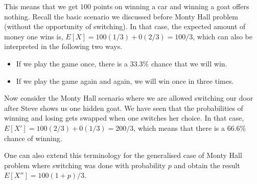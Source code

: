 \documentclass{book}
\begin{document}
This means that we get $100$ points on winning a car and winning a goat offers nothing. Recall the basic scenario we discussed before Monty Hall problem (without the opportunity of switching). In that case, the expected amount of money one wins is, $E[X] = 100(1/3) + 0 (2/3) = 100/3$, which can also be interpreted in the following two ways. 

\begin{itemize}
\item If we play the game once, there is a $33.3\%$ chance that we will win. 
\item If we play the game again and again, we will win once in three times. 
\end{itemize}

Now consider the Monty Hall scenario where we are allowed switching our door after Steve shows us one hidden goat. We have seen that the probabilities of winning and losing gets swapped when one switches her choice. In that case, $E[X'] = 100(2/3) + 0 (1/3) = 200/3$, which means that there is a $66.6\%$ chance of winning. 

One can also extend this terminology for the generalised case of Monty Hall problem where switching was done with probability $p$ and obtain the result $E[X'']=100(1+p)/3$.




\end{document}
